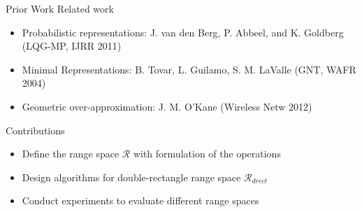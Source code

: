 \begin{frame}{Prior Work}
Related work
\begin{itemize}
\item Probabilistic representations: J. van den Berg,
  P. Abbeel, and K. Goldberg (LQG-MP, IJRR 2011)
\item Minimal Representations: B. Tovar, L. Guilamo, S. M. LaValle (GNT, WAFR 2004)
\item Geometric over-approximation: J. M. O'Kane (Wireless Netw 2012)
\end{itemize}
Contributions
\begin{itemize}
\item Define the range space $\mathcal{R}$ with formulation of the operations
\item Design algorithms for double-rectangle range space $\mathcal{R}_{drect}$
\item Conduct experiments to evaluate different range spaces
\end{itemize}
\end{frame}